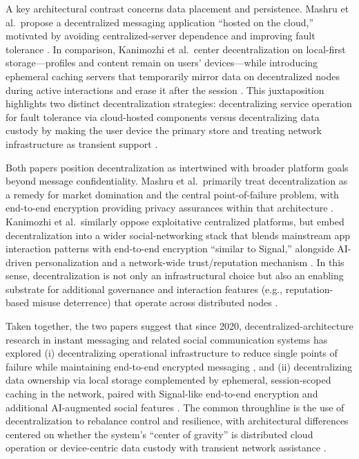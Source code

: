 A key architectural contrast concerns data placement and persistence. Mashru et al.\ propose a decentralized messaging application “hosted on the cloud,” motivated by avoiding centralized-server dependence and improving fault tolerance \cite{mashru2023}. In comparison, Kanimozhi et al.\ center decentralization on local-first storage—profiles and content remain on users’ devices—while introducing ephemeral caching servers that temporarily mirror data on decentralized nodes during active interactions and erase it after the session \cite{kanimozhi2025}. This juxtaposition highlights two distinct decentralization strategies: decentralizing service operation for fault tolerance via cloud-hosted components \cite{mashru2023} versus decentralizing data custody by making the user device the primary store and treating network infrastructure as transient support \cite{kanimozhi2025}.

Both papers position decentralization as intertwined with broader platform goals beyond message confidentiality. Mashru et al.\ primarily treat decentralization as a remedy for market domination and the central point-of-failure problem, with end-to-end encryption providing privacy assurances within that architecture \cite{mashru2023}. Kanimozhi et al.\ similarly oppose exploitative centralized platforms, but embed decentralization into a wider social-networking stack that blends mainstream app interaction patterns with end-to-end encryption “similar to Signal,” alongside AI-driven personalization and a network-wide trust/reputation mechanism \cite{kanimozhi2025}. In this sense, decentralization is not only an infrastructural choice but also an enabling substrate for additional governance and interaction features (e.g., reputation-based misuse deterrence) that operate across distributed nodes \cite{kanimozhi2025}.

Taken together, the two papers suggest that since 2020, decentralized-architecture research in instant messaging and related social communication systems has explored (i) decentralizing operational infrastructure to reduce single points of failure while maintaining end-to-end encrypted messaging \cite{mashru2023}, and (ii) decentralizing data ownership via local storage complemented by ephemeral, session-scoped caching in the network, paired with Signal-like end-to-end encryption and additional AI-augmented social features \cite{kanimozhi2025}. The common throughline is the use of decentralization to rebalance control and resilience, with architectural differences centered on whether the system’s “center of gravity” is distributed cloud operation or device-centric data custody with transient network assistance \cite{mashru2023,kanimozhi2025}.

